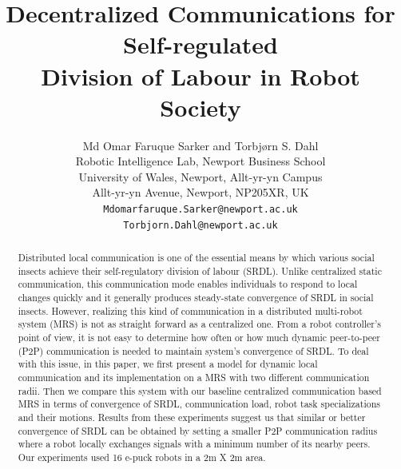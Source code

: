 \documentclass[letterpaper, 10 pt, conference]{ieeeconf}  %
\title{\LARGE \bf
Decentralized Communications for Self-regulated\\ Division of Labour in Robot Society
}
\author{ Md Omar Faruque Sarker and Torbj{\o}rn S. Dahl\\
        Robotic Intelligence Lab, Newport Business School\\
		University of Wales, Newport, Allt-yr-yn Campus\\ 
		Allt-yr-yn Avenue, Newport, NP205XR, UK\\
		{\tt\small Mdomarfaruque.Sarker@newport.ac.uk}\\ 
		{\tt\small Torbjorn.Dahl@newport.ac.uk}      
}
\begin{document}
\maketitle
\thispagestyle{empty}
\pagestyle{empty}


\begin{abstract}

Distributed local communication is one of the essential means by which various social insects achieve their self-regulatory division of labour (SRDL). Unlike centralized static communication, this communication mode enables individuals to respond to local changes quickly and it generally produces steady-state convergence of SRDL in social insects. However, realizing this kind of communication in a distributed multi-robot system (MRS) is not as straight forward as a centralized one. From a robot controller's point of view, it is not easy to determine how often or how much dynamic peer-to-peer (P2P) communication is needed to maintain system's convergence of SRDL. To deal with this issue, in this paper, we first present a model for dynamic local communication and its implementation on a MRS with two different communication radii. Then we compare this system with our baseline centralized communication based MRS in terms of convergence of SRDL, communication load, robot task specializations and their motions.  Results from these experiments suggest us that similar or better convergence of SRDL can be obtained by setting a smaller P2P communication radius where a robot locally exchanges signals with a minimum number of its nearby peers. Our experiments used 16 e-puck robots in a 2m X 2m area.
%
\end{abstract}
%
\end{document}
